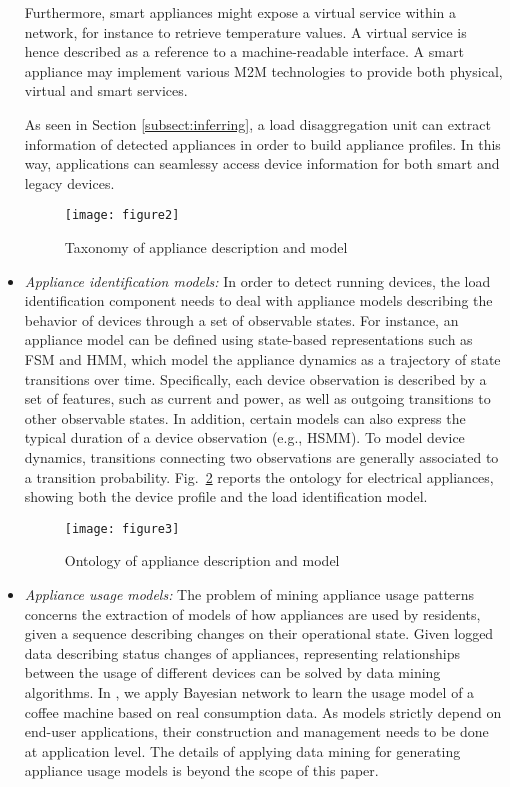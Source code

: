 \documentclass{article}
\begin{document}
\begin{itemize}
 Furthermore, smart appliances might expose a virtual service within a network, for instance to retrieve temperature values.
A virtual service is hence described as a reference to a machine-readable interface.
  A smart appliance may implement various M2M technologies to provide both physical, virtual and smart services.

  As seen in Section \ref{subsect:inferring}, a load disaggregation unit can extract information of detected appliances in order to build appliance profiles.
  In this way, applications can seamlessy access device information for both smart and legacy devices.
  \begin{figure}[h!]
\centering
\texttt{[image: figure2]}
\caption{Taxonomy of appliance description and model}
\label{fig:taxonomy}
\end{figure}
\item \textit{Appliance identification models:}
  In order to detect running devices, the load identification component needs to deal with appliance models describing the behavior of devices through a set of observable states.
For instance, an appliance model can be defined using state-based representations such as \ac{FSM} and \ac{HMM}, which model the appliance dynamics as a trajectory of state transitions over time.
  Specifically, each device observation is described by a set of features, such as current and power, as well as outgoing transitions to other observable states.
  In addition, certain models can also express the typical duration of a device observation (e.g., \ac{HSMM}).
  To model device dynamics, transitions connecting two observations are generally associated to a transition probability.
Fig.~\ref{fig:ontology} reports the ontology for electrical appliances, showing both the device profile and the load identification model.
	  \begin{figure}[h!]
\centering
\texttt{[image: figure3]}
\caption{Ontology of appliance description and model}
\label{fig:ontology}
\end{figure}
\item \textit{Appliance usage models:}
  The problem of mining appliance usage patterns concerns the extraction of models of how appliances are used by residents, given a sequence describing changes on their operational state.
  Given logged data describing status changes of appliances, representing relationships between the usage of different devices can be solved by data mining algorithms. In \cite{Andrea2014}, we apply Bayesian network to learn the usage model of a coffee machine based on real consumption data.
  As models strictly depend on end-user applications, their construction and management needs to be done at application level.
  The details of applying data mining for generating appliance usage models is beyond the scope of this paper.
\end{itemize}
\end{document}
